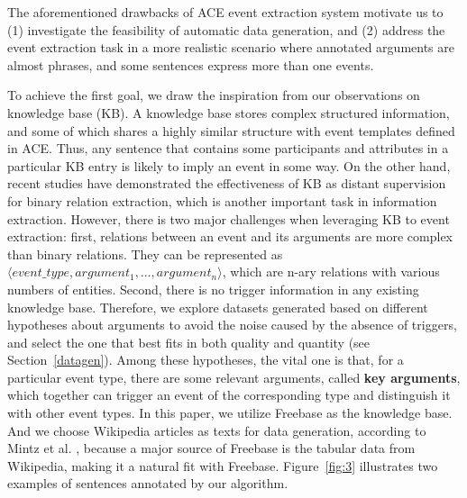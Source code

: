 \documentclass{article}
\begin{document}
The aforementioned drawbacks of ACE event extraction system motivate us to (1) investigate the feasibility of automatic data generation, and (2) address the event extraction task in a more realistic scenario where annotated arguments are almost phrases, and some sentences express more than one events.

To achieve the first goal, we draw the inspiration from our observations on knowledge base (KB). A knowledge base stores complex structured information, and some of which shares a highly similar structure with event templates defined in ACE. Thus, any sentence that contains some participants and attributes in a particular KB entry is likely to imply an event in some way. On the other hand, recent studies \cite{mintz2009distant} have demonstrated the effectiveness of KB as distant supervision for binary relation extraction, which is another important task in information extraction. However, there is two major challenges when leveraging KB to event extraction: first, relations between an event and its arguments are more complex than binary relations. They can be represented as $\langle event\_type, argument_1, \ldots, argument_n\rangle$, which are n-ary relations with various numbers of entities. Second, there is no trigger information in any existing knowledge base. 
Therefore, we explore datasets generated based on different hypotheses about arguments to avoid the noise caused by the absence of triggers, and select the one that best fits in both quality and quantity (see Section~\ref{datagen}). Among these hypotheses, the vital one is that, for a particular event type, there are some relevant arguments, called \textbf{key arguments}, which together can trigger an event of the corresponding type and distinguish it with other event types. In this paper, we utilize Freebase as the knowledge base. And we choose Wikipedia articles as texts for data generation, according to Mintz et al. , because a major source of Freebase is the tabular data from Wikipedia, making it a natural fit with Freebase. Figure~\ref{fig:3} illustrates two examples of sentences annotated by our algorithm.
\end{document}
